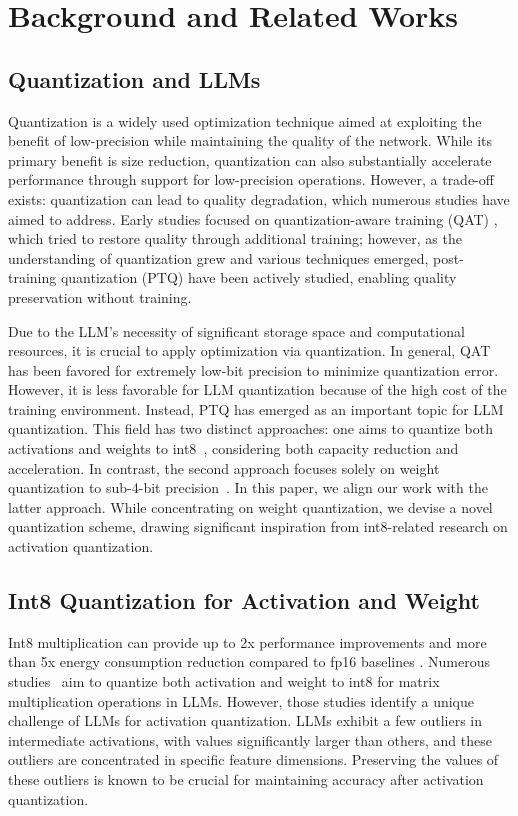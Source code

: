 \documentclass[letterpaper]{article} %
\begin{document}
\section{Background and Related Works} \label{sec:background}
\subsection{Quantization and LLMs}
Quantization is a widely used optimization technique aimed at exploiting the benefit of low-precision while maintaining the quality of the network. While its primary benefit is size reduction, quantization can also substantially accelerate performance through support for low-precision operations. However, a trade-off exists: quantization can lead to quality degradation, which numerous studies have aimed to address. Early studies focused on quantization-aware training (QAT) \cite{esser2019learned, zhou2016dorefa}, which tried to restore quality through additional training; however, as the understanding of quantization grew and various techniques emerged, post-training quantization (PTQ) \cite{librecq, nagel2019data, nagel2020up, weiqdrop} have been actively studied, enabling quality preservation without training. 

Due to the LLM's necessity of significant storage space and computational resources, it is crucial to apply optimization via quantization. In general, QAT has been favored for extremely low-bit precision to minimize quantization error. However, it is less favorable for LLM quantization because of the high cost of the training environment. Instead, PTQ has emerged as an important topic for LLM quantization. This field has two distinct approaches: one aims to quantize both activations and weights to int8~\cite{dettmers2022llm, xiao2022smoothquant}, considering both capacity reduction and acceleration. 
In contrast, the second approach focuses solely on weight quantization to sub-4-bit precision~\cite{frantar2023optq,park2023lutgemm}. In this paper, we align our work with the latter approach. While concentrating on weight quantization, we devise a novel quantization scheme, drawing significant inspiration from int8-related research on activation quantization.

\subsection{Int8 Quantization for Activation and Weight}

Int8 multiplication can provide up to 2x performance improvements and more than 5x energy consumption reduction compared to fp16 baselines \cite{horowitz20141}. Numerous studies~\cite{dettmers2022llm, xiao2022smoothquant} aim to quantize both activation and weight to int8 for matrix multiplication operations in LLMs. However, those studies identify a unique challenge of LLMs for activation quantization. LLMs exhibit a few outliers in intermediate activations, with values significantly larger than others, and these outliers are concentrated in specific feature dimensions. Preserving the values of these outliers is known to be crucial for maintaining accuracy after activation quantization.
\end{document}
